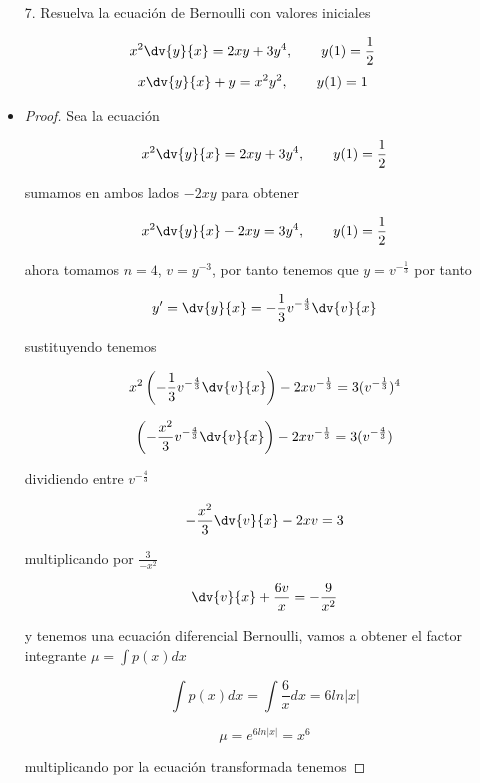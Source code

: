 \begin{enumerate}
    \item[7.] Resuelva la ecuación de Bernoulli con valores iniciales
\end{enumerate}
\begin{align*}
    x^{2} \dv{y}{x} = 2xy + 3y^{4}, \qquad y(1)=\frac{1}{2}
\end{align*}
\begin{align*}
    x \dv{y}{x} +y = x^{2}y^{2}, \qquad y(1)=1
\end{align*}

\begin{itemize}
    \item \begin{proof}

Sea la ecuación 

\begin{align*}
    x^{2} \dv{y}{x} = 2xy + 3y^{4}, \qquad y(1)=\frac{1}{2}
\end{align*}

sumamos en ambos lados $-2xy$ para obtener

\begin{align*}
    x^{2} \dv{y}{x}-2xy = 3y^{4}, \qquad y(1)=\frac{1}{2}
\end{align*}

ahora tomamos $n=4$, $v=y^{-3}$, por tanto tenemos que $y=v^{-\frac{1}{3}}$ por tanto 

$$y'=\dv{y}{x}=-\frac{1}{3}v^{-\frac{4}{3}}\dv{v}{x}$$

sustituyendo tenemos

$$x^2\left(-\frac{1}{3}v^{-\frac{4}{3}}\dv{v}{x}\right)-2xv^{-\frac{1}{3}}=3(v^{-\frac{1}{3}})^4$$

$$\left(-\frac{x^2}{3}v^{-\frac{4}{3}}\dv{v}{x}\right)-2xv^{-\frac{1}{3}}=3(v^{-\frac{4}{3}})$$

dividiendo entre $v^{-\frac{4}{3}}$ 

$$-\frac{x^2}{3}\dv{v}{x}-2xv=3$$

multiplicando por $\frac{3}{-x^2}$

$$\dv{v}{x}+\frac{6v}{x}=-\frac{9}{x^2}$$

y tenemos una ecuación diferencial Bernoulli, vamos a obtener el factor integrante $\mu=\int p(x)dx$

$$\int p(x)dx=\int \frac{6}{x}dx = 6ln|x|$$

$$\mu=e^{6ln|x|}=x^6$$

multiplicando por la ecuación transformada tenemos


\end{proof}
\end{itemize}

